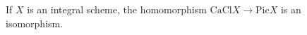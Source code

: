 If $X$ is an integral scheme, the homomorphism $\text{CaCl} X \rightarrow \text{Pic} X$ is an isomorphism.
